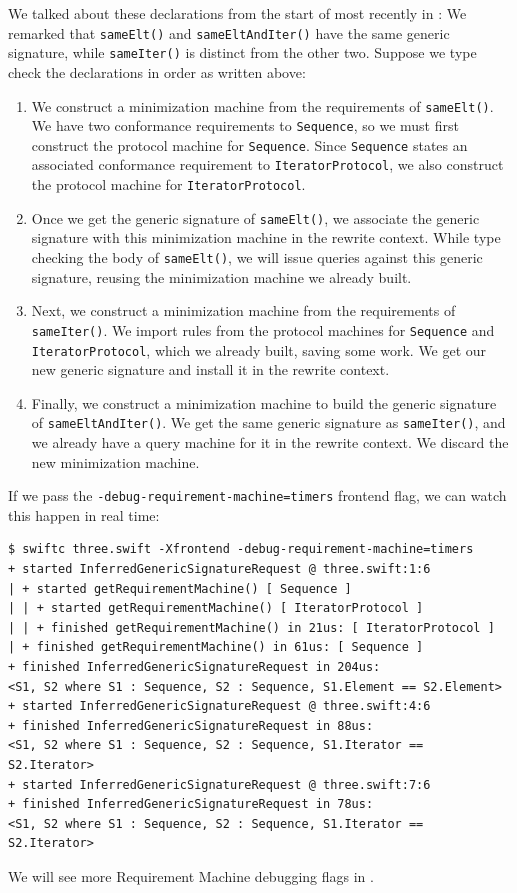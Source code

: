 \documentclass[../generics]{subfiles}
\begin{document}
\begin{example}
We talked about these declarations from the start of  most recently in :
We remarked that \texttt{sameElt()} and \texttt{sameEltAndIter()} have the same generic signature, while \texttt{sameIter()} is distinct from the other two. Suppose we type check the declarations in order as written above:
\begin{enumerate}
\item We construct a minimization machine from the requirements of \texttt{sameElt()}. We have two conformance requirements to \texttt{Sequence}, so we must first construct the protocol machine for \texttt{Sequence}. Since \texttt{Sequence} states an associated conformance requirement to \texttt{IteratorProtocol}, we also construct the protocol machine for \texttt{IteratorProtocol}.
\item Once we get the generic signature of \texttt{sameElt()}, we associate the generic signature with this minimization machine in the rewrite context. While type checking the body of \texttt{sameElt()}, we will issue queries against this generic signature, reusing the minimization machine we already built.
\item Next, we construct a minimization machine from the requirements of \texttt{sameIter()}. We import rules from the protocol machines for \texttt{Sequence} and \texttt{IteratorProtocol}, which we already built, saving some work. We get our new generic signature and install it in the rewrite context.
\item Finally, we construct a minimization machine to build the generic signature of \texttt{sameEltAndIter()}. We get the same generic signature as \texttt{sameIter()}, and we already have a query machine for it in the rewrite context. We discard the new minimization machine.
\end{enumerate}
If we pass the \texttt{-debug-requirement-machine=timers} frontend flag, we can watch this happen in real time:
\begin{Verbatim}[fontsize=\footnotesize,numbers=none]
$ swiftc three.swift -Xfrontend -debug-requirement-machine=timers
+ started InferredGenericSignatureRequest @ three.swift:1:6
| + started getRequirementMachine() [ Sequence ]
| | + started getRequirementMachine() [ IteratorProtocol ]
| | + finished getRequirementMachine() in 21us: [ IteratorProtocol ]
| + finished getRequirementMachine() in 61us: [ Sequence ]
+ finished InferredGenericSignatureRequest in 204us:
<S1, S2 where S1 : Sequence, S2 : Sequence, S1.Element == S2.Element>
+ started InferredGenericSignatureRequest @ three.swift:4:6
+ finished InferredGenericSignatureRequest in 88us:
<S1, S2 where S1 : Sequence, S2 : Sequence, S1.Iterator == S2.Iterator>
+ started InferredGenericSignatureRequest @ three.swift:7:6
+ finished InferredGenericSignatureRequest in 78us:
<S1, S2 where S1 : Sequence, S2 : Sequence, S1.Iterator == S2.Iterator>
\end{Verbatim}
We will see more Requirement Machine debugging flags in .
\end{example}
\end{document}
